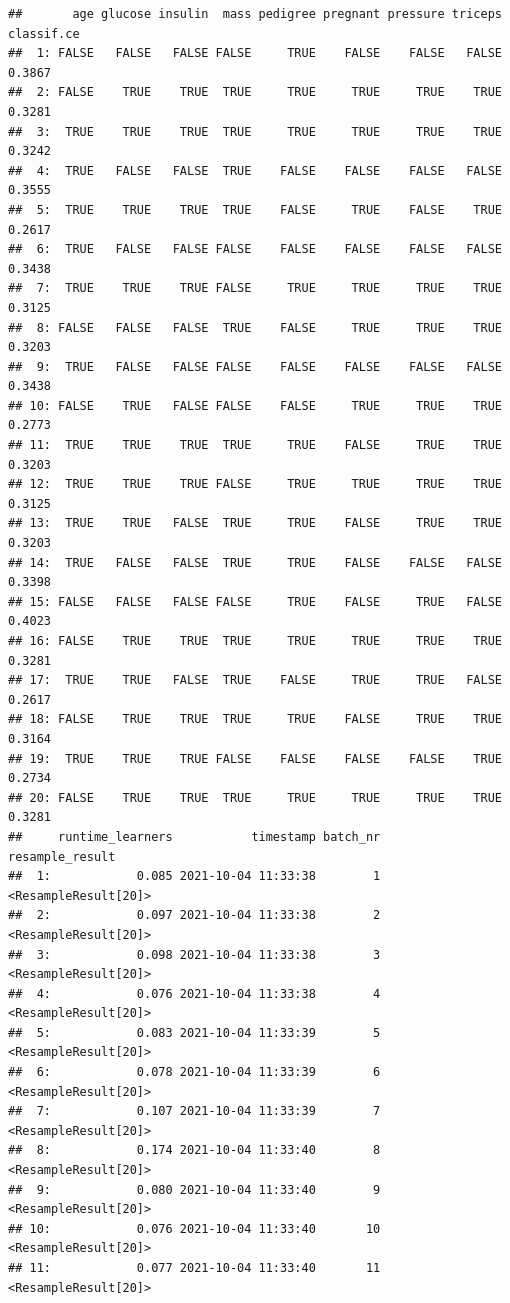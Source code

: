 \documentclass[
]{scrbook}
\begin{document}
\begin{verbatim}
##       age glucose insulin  mass pedigree pregnant pressure triceps classif.ce
##  1: FALSE   FALSE   FALSE FALSE     TRUE    FALSE    FALSE   FALSE     0.3867
##  2: FALSE    TRUE    TRUE  TRUE     TRUE     TRUE     TRUE    TRUE     0.3281
##  3:  TRUE    TRUE    TRUE  TRUE     TRUE     TRUE     TRUE    TRUE     0.3242
##  4:  TRUE   FALSE   FALSE  TRUE    FALSE    FALSE    FALSE   FALSE     0.3555
##  5:  TRUE    TRUE    TRUE  TRUE    FALSE     TRUE    FALSE    TRUE     0.2617
##  6:  TRUE   FALSE   FALSE FALSE    FALSE    FALSE    FALSE   FALSE     0.3438
##  7:  TRUE    TRUE    TRUE FALSE     TRUE     TRUE     TRUE    TRUE     0.3125
##  8: FALSE   FALSE   FALSE  TRUE    FALSE     TRUE     TRUE    TRUE     0.3203
##  9:  TRUE   FALSE   FALSE FALSE    FALSE    FALSE    FALSE   FALSE     0.3438
## 10: FALSE    TRUE   FALSE FALSE    FALSE     TRUE     TRUE    TRUE     0.2773
## 11:  TRUE    TRUE    TRUE  TRUE     TRUE    FALSE     TRUE    TRUE     0.3203
## 12:  TRUE    TRUE    TRUE FALSE     TRUE     TRUE     TRUE    TRUE     0.3125
## 13:  TRUE    TRUE   FALSE  TRUE     TRUE    FALSE     TRUE    TRUE     0.3203
## 14:  TRUE   FALSE   FALSE  TRUE     TRUE    FALSE    FALSE   FALSE     0.3398
## 15: FALSE   FALSE   FALSE FALSE     TRUE    FALSE     TRUE   FALSE     0.4023
## 16: FALSE    TRUE    TRUE  TRUE     TRUE     TRUE     TRUE    TRUE     0.3281
## 17:  TRUE    TRUE   FALSE  TRUE    FALSE     TRUE     TRUE   FALSE     0.2617
## 18: FALSE    TRUE    TRUE  TRUE     TRUE    FALSE     TRUE    TRUE     0.3164
## 19:  TRUE    TRUE    TRUE FALSE    FALSE    FALSE    FALSE    TRUE     0.2734
## 20: FALSE    TRUE    TRUE  TRUE     TRUE     TRUE     TRUE    TRUE     0.3281
##     runtime_learners           timestamp batch_nr      resample_result
##  1:            0.085 2021-10-04 11:33:38        1 <ResampleResult[20]>
##  2:            0.097 2021-10-04 11:33:38        2 <ResampleResult[20]>
##  3:            0.098 2021-10-04 11:33:38        3 <ResampleResult[20]>
##  4:            0.076 2021-10-04 11:33:38        4 <ResampleResult[20]>
##  5:            0.083 2021-10-04 11:33:39        5 <ResampleResult[20]>
##  6:            0.078 2021-10-04 11:33:39        6 <ResampleResult[20]>
##  7:            0.107 2021-10-04 11:33:39        7 <ResampleResult[20]>
##  8:            0.174 2021-10-04 11:33:40        8 <ResampleResult[20]>
##  9:            0.080 2021-10-04 11:33:40        9 <ResampleResult[20]>
## 10:            0.076 2021-10-04 11:33:40       10 <ResampleResult[20]>
## 11:            0.077 2021-10-04 11:33:40       11 <ResampleResult[20]>

\end{verbatim}
\end{document}
